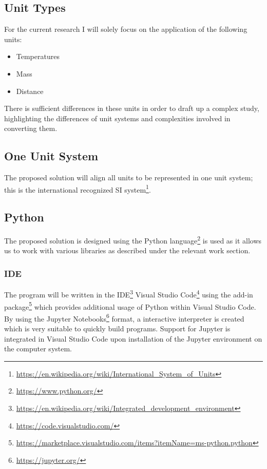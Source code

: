 \documentclass[sigchi, nonacm]{acmart}
\begin{document}

\subsection{Unit Types}
For the current research I will solely focus on the application of the following units:
\begin{itemize}
    \item{Temperatures}
    \item{Mass}
    \item{Distance}
\end{itemize}
There is sufficient differences in these units in order to draft up a complex study, highlighting the differences of unit systems and complexities involved in converting them.

\subsection{One Unit System}
The proposed solution will align all units to be represented in one unit system; this is the international recognized SI system\footnote{\raggedright{\url{https://en.wikipedia.org/wiki/International_System_of_Units}}}.

\subsection{Python}
The proposed solution is designed using the Python language\footnote{\raggedright{\url{https://www.python.org/}}} is used as it allows us to work with various libraries as described under the relevant work section.
\subsubsection{IDE}
The program will be written in the IDE\footnote{\raggedright{\url{https://en.wikipedia.org/wiki/Integrated_development_environment}}} Visual Studio Code\footnote{\raggedright{\url{https://code.visualstudio.com/}}} using the add-in package\footnote{\raggedright{\url{https://marketplace.visualstudio.com/items?itemName=ms-python.python}}} which provides additional usage of Python within Visual Studio Code. By using the Jupyter Notebooks\footnote{\raggedright\url{https://jupyter.org/}} format, a interactive interpreter is created which is very suitable to quickly build programs. Support for Jupyter is integrated in Visual Studio Code upon installation of the Jupyter environment on the computer system.
\end{document}
